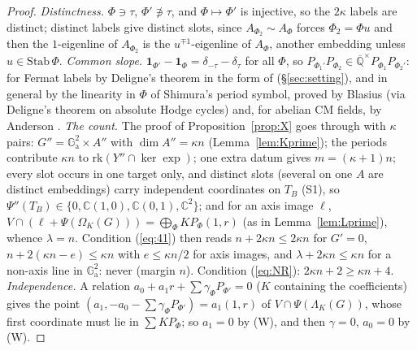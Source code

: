\documentclass[11pt]{amsart}
\theoremstyle{definition}
\newcommand{\Qb}{\overline{\mathbb{Q}}}
\newcommand{\C}{\mathbb{C}}
\newcommand{\Ga}{\mathbb{G}_{\mathrm a}}
\begin{document}
\begin{proof}
\emph{Distinctness.} $\Phi\ni\tau$, $\Phi'\not\ni\tau$, and $\Phi\mapsto\Phi'$ is injective, so the $2\kappa$ labels are
distinct; distinct labels give distinct slots, since $A_{\Phi_2}\sim A_\Phi$ forces $\Phi_2=\Phi u$ and then the
$1$-eigenline of $A_{\Phi_2}$ is the $u^{\mp1}$-eigenline of $A_\Phi$, another embedding unless $u\in\mathrm{Stab}\,\Phi$.
\emph{Common slope.} $\mathbf 1_{\Phi'}-\mathbf 1_\Phi=\delta_{-\tau}-\delta_\tau$ for all $\Phi$, so
$P_{\Phi_1'}P_{\Phi_2}\in\Qb^\times P_{\Phi_1}P_{\Phi_2'}$: for Fermat labels by Deligne's theorem \cite{De82} in the form of
\cite{KO79} (\S\ref{sec:setting}), and in general by the linearity in $\Phi$ of Shimura's period symbol, proved by Blasius
\cite{Bl86} (via Deligne's theorem on absolute Hodge cycles) and, for abelian CM fields, by Anderson \cite{An82}.
\emph{The count.} The proof of Proposition~\ref{prop:X} goes through with $\kappa$ pairs: $G''=\Ga^2\times A''$ with
$\dim A''=\kappa n$ (Lemma~\ref{lem:Kprime}); the periods contribute $\kappa n$ to $\mathrm{rk}(Y''\cap\ker\exp)$; one extra
datum gives $m=(\kappa+1)n$; every slot occurs in one target only, and distinct slots (several on one $A$ are distinct
embeddings) carry independent coordinates on $T_B$ (S1), so $\Psi''(T_B)\in\{0,\C(1,0),\C(0,1),\C^2\}$; and for an axis
image $\ell$, $V\cap(\ell+\Psi(\Omega_K(G)))=\bigoplus_\Phi KP_\Phi(1,r)$ (as in Lemma~\ref{lem:Lprime}), whence $\lambda=n$.
Condition (\ref{eq:41}) then reads $n+2\kappa n\le2\kappa n$ for $G'=0$, $n+2(\kappa n-e)\le\kappa n$ with $e\le\kappa n/2$ for axis
images, and $\lambda+2\kappa n\le\kappa n$ for a non-axis line in $\Ga^2$: never (margin $n$). Condition (\ref{eq:NR}):
$2\kappa n+2\ge\kappa n+4$. \emph{Independence.} A relation $a_0+a_1r+\sum\gamma_\Phi P_{\Phi'}=0$ ($K$ containing the
coefficients) gives the point $(a_1,-a_0-\sum\gamma_\Phi P_{\Phi'})=a_1(1,r)$ of $V\cap\Psi(\Lambda_K(G))$, whose first
coordinate must lie in $\sum KP_\Phi$; so $a_1=0$ by (W), and then $\gamma=0$, $a_0=0$ by (W).
\end{proof}
\end{document}
